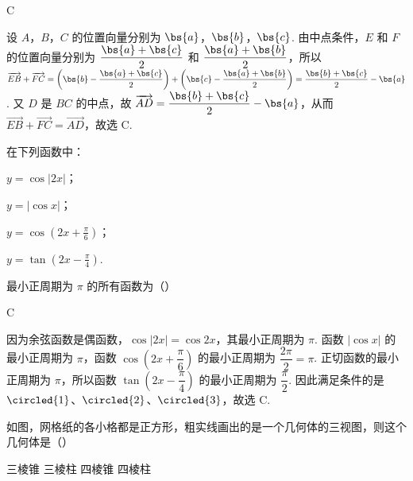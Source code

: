 \begin{answer}
C
\end{answer}

\begin{solution}
设 \(A\)，\(B\)，\(C\) 的位置向量分别为 \(\bs{a}\)，\(\bs{b}\)，\(\bs{c}\). 由中点条件，\(E\) 和 \(F\) 的位置向量分别为 \(\dfrac{\bs{a}+\bs{c}}{2}\) 和 \(\dfrac{\bs{a}+\bs{b}}{2}\)，所以 \(\overrightarrow{EB}+\overrightarrow{FC}=\left(\bs{b}-\dfrac{\bs{a}+\bs{c}}{2}\right)+\left(\bs{c}-\dfrac{\bs{a}+\bs{b}}{2}\right)=\dfrac{\bs{b}+\bs{c}}{2}-\bs{a}\). 又 \(D\) 是 \(BC\) 的中点，故 \(\overrightarrow{AD}=\dfrac{\bs{b}+\bs{c}}{2}-\bs{a}\)，从而 \(\overrightarrow{EB}+\overrightarrow{FC}=\overrightarrow{AD}\)，故选 C.
\end{solution}

\begin{problem}
在下列函数中：

\begin{circlelist}
\item \(y = \cos |2x|\)；
\item \(y = |\cos x|\)；
\item \(y = \cos \left(2x + \frac{\pi}{6}\right)\)；
\item \(y = \tan \left(2x - \frac{\pi}{4}\right)\).
\end{circlelist}

最小正周期为 \(\pi\) 的所有函数为（\quad）

\choices
    {}
    {}
    {}
    {}
\end{problem}

\begin{answer}
C
\end{answer}

\begin{solution}
因为余弦函数是偶函数，\(\cos|2x|=\cos 2x\)，其最小正周期为 \(\pi\). 函数 \(|\cos x|\) 的最小正周期为 \(\pi\)，函数 \(\cos\left(2x+\dfrac{\pi}{6}\right)\) 的最小正周期为 \(\dfrac{2\pi}{2}=\pi\). 正切函数的最小正周期为 \(\pi\)，所以函数 \(\tan\left(2x-\dfrac{\pi}{4}\right)\) 的最小正周期为 \(\dfrac{\pi}{2}\). 因此满足条件的是 \(\circled{1}\)、\(\circled{2}\)、\(\circled{3}\)，故选 C.
\end{solution}

\begin{problem}
如图，网格纸的各小格都是正方形，粗实线画出的是一个几何体的三视图，则这个几何体是（\quad）


\choices
    {三棱锥}
    {三棱柱}
    {四棱锥}
    {四棱柱}
\end{problem}

